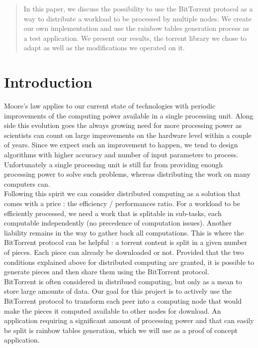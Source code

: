 \documentclass[a4paper]{article}
\begin{document}
{\begin{abstract}
In this paper, we discuss the possibility to use the BitTorrent protocol as a way to distribute a workload to be processed by multiple nodes. We create our own implementation and use the rainbow tables generation process as a test application. We present our results, the torrent library we chose to adapt as well as the modifications we operated on it.
\end{abstract}
\vspace{2mm}

\section{Introduction}

Moore's law applies to our current state of technologies with periodic improvements of the computing power available in a single processing unit. Along side this evolution goes the always growing need for more processing power as scientists can count on large improvements on the hardware level within a couple of years. Since we expect such an improvement to happen, we tend to design algorithms with higher accuracy and number of input parameters to process. Unfortunately a single processing unit is still far from providing enough processing power to solve such problems, whereas distributing the work on many computers can.\\

Following this spirit we can consider distributed computing as a solution that comes with a price : the efficiency / performances ratio. For a workload to be efficiently processed, we need a work that is splitable in sub-tasks, each computable independently (no precedence of computation issues). Another liability remains in the way to gather back all computations. This is where the BitTorrent protocol can be helpful : a torrent content is split in a given number of pieces. Each piece can already be downloaded or not. Provided that the two conditions explained above for distributed computing are granted, it is possible to generate pieces and then share them using the BitTorrent protocol.\\

BitTorrent is often considered in distribued computing, but only as a mean to store large amounts of data. Our goal for this project is to actively use the BitTorrent protocol to transform each peer into a computing node that would make the pieces it computed available to other nodes for download. An application requiring a significant amount of processing power and that can easily be split is rainbow tables generation, which we will use as a proof of concept application.\\

}
\end{document}

